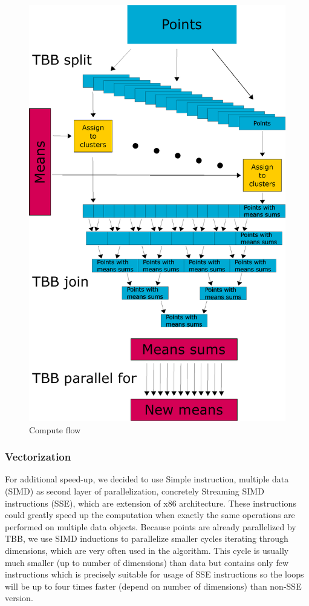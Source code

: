\begin{figure}[h]
  \centering
  \includegraphics[width=1\linewidth]{img/computeFlow.eps}
  \caption{Compute flow}
  \label{fig:computeflow}
\end{figure}
\subsubsection{Vectorization}
For additional speed-up, we decided to use Simple instruction, multiple data (SIMD) as second layer of parallelization, concretely Streaming SIMD instructions (SSE), which are extension of x86 architecture. These instructions could greatly speed up the computation when exactly the same operations are performed on multiple data objects. Because points are already parallelized by TBB, we use SIMD inductions to parallelize smaller cycles iterating through dimensions, which are very often used in the algorithm. This cycle is usually much smaller (up to number of dimensions) than data but contains only few instructions which is precisely suitable for usage of SSE instructions so the loops will be up to four times faster (depend on number of dimensions) than non-SSE version.
\clearpage
